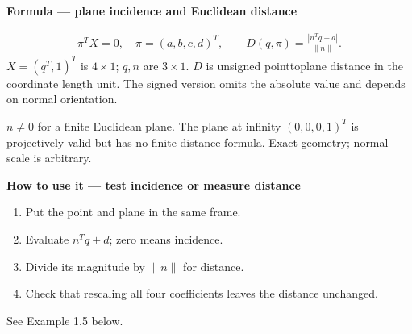 \documentclass[letterpaper,11pt,english,openany,oneside]{jupyterBook}
\begin{document}
\ignorespaces
{}\ignorespaces
{}\ignorespaces
{}\ignorespaces
\begin{TextbookBox}
\textbf{Formula — plane incidence and Euclidean distance}\par\smallskip
\begin{equation}\label{equation:lectures/lecture01/planes-lines:eq-lec01-plane}
\begin{split}\pi^T X=0,\quad \pi=(a,b,c,d)^T,\qquad
D(q,\pi)=\frac{|n^Tq+d|}{\|n\|}.\end{split}
\end{equation}
\sphinxAtStartPar
\(X=(q^T,1)^T\) is \(4\times1\); \(q,n\) are \(3\times1\). \(D\) is unsigned point\sphinxhyphen{}to\sphinxhyphen{}plane distance in the coordinate length unit. The signed version omits the absolute value and depends on normal orientation.

\sphinxAtStartPar
{} \(n\ne0\) for a finite Euclidean plane. The plane at infinity \((0,0,0,1)^T\) is projectively valid but has no finite distance formula. Exact geometry; normal scale is arbitrary.

\end{TextbookBox}

\begin{TextbookBox}
\textbf{How to use it — test incidence or measure distance}\par\smallskip
\begin{enumerate}
%
\item {}
\sphinxAtStartPar
Put the point and plane in the same frame.

\item {}
\sphinxAtStartPar
Evaluate \(n^Tq+d\); zero means incidence.

\item {}
\sphinxAtStartPar
Divide its magnitude by \(\|n\|\) for distance.

\item {}
\sphinxAtStartPar
Check that rescaling all four coefficients leaves the distance unchanged.

\end{enumerate}

\sphinxAtStartPar
See Example 1.5 below.

\end{TextbookBox}
\end{document}
